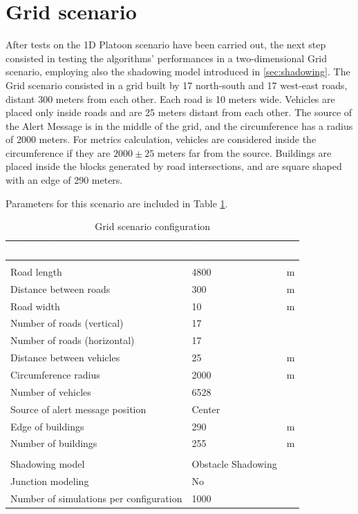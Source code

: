 	\section{Grid scenario}
		\label{sec:grid}
		After tests on the 1D Platoon scenario have been carried out, the next step consisted in testing the algorithms' performances in a two-dimensional Grid scenario, employing also the shadowing model introduced in \ref{sec:shadowing}. The Grid scenario consisted in a grid built by 17 north-south and 17 west-east roads, distant 300 meters from each other. Each road is 10 meters wide. Vehicles are placed only inside roads and are 25 meters distant from each other. The source of the Alert Message is in the middle of the grid, and the circumference has a radius of 2000 meters. For metrics calculation, vehicles are considered inside the circumference if they are $2000 \pm 25$ meters far from the source. Buildings are placed inside the blocks generated by road intersections, and are square shaped with an edge of 290 meters.
		
		
		Parameters for this scenario are included in Table \ref{tab:grid}.  
		
		\begin{table}[H]
			\def\arraystretch{1.1}
			\begin{tabularx}{\textwidth}{l | l  l}
				\rowcolor{I} {\large \textcolor{white}{Parameter}} & {\large \textcolor{white}{Value}} & {\large \textcolor{white}{}} \TBstrut  \\
				\toprule
				\endhead
				\rowcolor{P} \multicolumn{3}{c}{Scenario configuration} \\
				\midrule[1pt]
				Road length 							& 4800	 				& m		\\
				Distance between roads					& 300					& m		\\
				Road width								& 10					& m		\\
				Number of roads (vertical)				& 17					&		\\
				Number of roads (horizontal)			& 17					&		\\
				Distance between vehicles 				& 25					& m		\\
				Circumference radius					& 2000					& m		\\
				Number of vehicles						& 6528					& 		\\
				Source of alert message position		& Center				&		\\
				Edge of buildings						& 290					& m		\\
				Number of buildings						& 255					& m		\\
				\midrule[1pt]
				\rowcolor{P} \multicolumn{3}{c}{Simulator configuration} \\
				\midrule[1pt]
				Shadowing model							& Obstacle Shadowing	&		\\
				Junction modeling						& No					&		\\
				\midrule[1pt]
				Number of simulations per configuration	& 1000					&		\\
				\bottomrule
			\end{tabularx}
			\caption{Grid scenario configuration}
			\label{tab:grid}
		\end{table}
	
